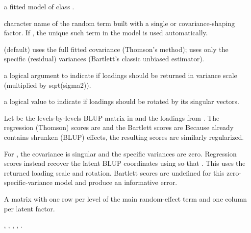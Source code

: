 \documentclass[a4paper]{book}
\begin{document}
\begin{Arguments}
\begin{ldescription}
\item[\code{object}] a fitted model of class .
\item[\code{term}] character name of the random term built with a single
 or  covariance-shaping factor. If , the
unique such term in the model is used automatically.
\item[\code{method}]  (default) uses the full fitted covariance
\eqn{\Sigma}{} (Thomson's method);  uses only the specific
(residual) variances \eqn{\Psi}{} (Bartlett's classic unbiased estimator).
\item[\code{varianceScale}] a logical argument to indicate if loadings should be returned 
in variance scale (multiplied by sqrt(sigma2)).
\item[\code{rotation}] a logical value to indicate if loadings should be rotated by its
singular vectors.
\end{ldescription}
\end{Arguments}
%
\begin{Details}\relax
Let  be the levels-by-levels BLUP matrix in 
and \eqn{\Lambda}{} the loadings from . The
regression (Thomson) scores are
and the Bartlett scores are
Because  already contains shrunken (BLUP) effects, the resulting
scores are similarly regularized.

For , the covariance is singular and the specific variances are
zero. Regression scores instead recover the latent BLUP coordinates using
so that . This uses the returned loading scale
and rotation. Bartlett scores are undefined for this zero-specific-variance
model and produce an informative error.
\end{Details}
%
\begin{Value}
A matrix with one row per level of the main random-effect term and one
column per latent factor.
\end{Value}
%
\begin{SeeAlso}\relax
{}, , , , .
\end{SeeAlso}
\end{document}
